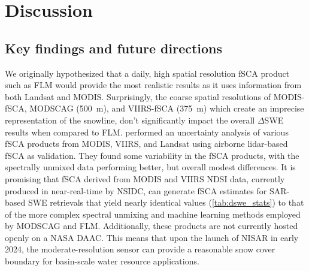 \hypertarget{ch5-discussion}{\section{Discussion}\label{ch4-discussion}}
\hypertarget{ch5-discussion-1}{\subsection{Key findings and future directions}\label{ch4-discussion}}

We originally hypothesized that a daily, high spatial resolution fSCA product such as FLM would provide the most realistic results as it uses information from both Landsat and MODIS. Surprisingly, the coarse spatial resolutions of MODIS-fSCA, MODSCAG (500~m), and VIIRS-fSCA (375~m) which create an imprecise representation of the snowline, don't significantly impact the overall $\Delta$SWE results when compared to FLM. \cite{stillingerLandsatMODISVIIRS2023a} performed an uncertainty analysis of various fSCA products from MODIS, VIIRS, and Landsat using airborne lidar-based fSCA as validation. They found some variability in the fSCA products, with the spectrally unmixed data performing better, but overall modest differences. It is promising that fSCA derived from MODIS and VIIRS NDSI data, currently produced in near-real-time by NSIDC, can generate fSCA estimates for SAR-based SWE retrievals that yield nearly identical values (\ref{tab:dswe_stats}) to that of the more complex spectral unmixing and machine learning methods employed by MODSCAG and FLM. Additionally, these products are not currently hosted openly on a NASA DAAC. This means that upon the launch of NISAR in early 2024, the moderate-resolution sensor can provide a reasonable snow cover boundary for basin-scale water resource applications. 

